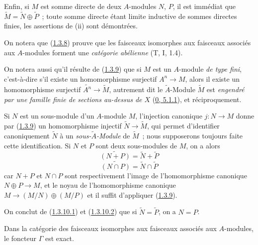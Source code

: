 Enfin, si $M$ est somme directe de deux $A$-modules $N$, $P$, il est immédiat
que $\widetilde{M}=\widetilde{N}\oplus\widetilde{P}$~; toute somme directe
étant limite inductive de sommes directes finies, les assertions de (ii) sont
démontrées.

On notera que (\hyperref[I.1.3.8-fr]{1.3.8}) prouve que les faisceaux
isomorphes aux faisceaux associés aux $A$-modules forment une
\emph{catégorie abélienne} (T, I, 1.4).

On notera aussi qu'il résulte de (\hyperref[I.1.3.9-fr]{1.3.9}) que si $M$ est
un $A$-module \emph{de type fini}, c'est-à-dire s'il existe un homomorphisme
surjectif $A^n\to M$, alors il existe un homomorphisme surjectif
$\widetilde{A^n}\to\widetilde{M}$, autrement dit le $\widetilde{A}$-Module
$\widetilde{M}$ est \emph{engendré par une famille finie de sections au-dessus
de $X$} (\hyperref[0.5.1.1-fr]{0, 5.1.1}), et réciproquement.

\begin{env}[1.3.10]
\label{I.1.3.10-fr}
Si $N$ est un sous-module d'un $A$-module $M$, l'injection canonique
$j:N\to M$ donne par (\hyperref[I.1.3.9-fr]{1.3.9}) un homomorphisme injectif
$\widetilde{N}\to\widetilde{M}$, qui permet d'identifier canoniquement
$\widetilde{N}$ à un \emph{sous-$\widetilde{A}$-Module} de $\widetilde{M}$~;
nous supposerons toujours faite cette identification. Si $N$ et $P$ sont deux
sous-modules de $M$, on a alors
\begin{equation}
  \widetilde{(N+P)}=\widetilde{N}+\widetilde{P}
  \tag{1.3.10.1}\label{I.1.3.10.1-fr}
\end{equation}
\begin{equation}
  \widetilde{(N\cap P)}=\widetilde{N}\cap\widetilde{P}
  \tag{1.3.10.2}\label{I.1.3.10.2-fr}
\end{equation}
car $N+P$ et $N\cap P$ sont respectivement l'image de l'homomorphisme
canonique $N\oplus P\to M$, et le noyau de l'homomorphisme canonique
$M\to(M/N)\oplus(M/P)$ et il suffit d'appliquer
(\hyperref[I.1.3.9-fr]{1.3.9}).

On conclut de (\hyperref[I.1.3.10.1-fr]{1.3.10.1}) et
(\hyperref[I.1.3.10.2-fr]{1.3.10.2}) que si
$\widetilde{N}=\widetilde{P}$, on a $N=P$.
\end{env}

\begin{corollary}[1.3.11]
\label{I.1.3.11-fr}
Dans la catégorie des faisceaux isomorphes aux faisceaux associés aux
$A$-modules, le foncteur $\Gamma$ est exact.
\end{corollary}

